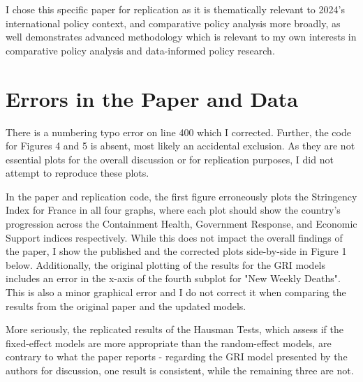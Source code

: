 \documentclass[12pt,letterpaper]{article}
\begin{document}
	\vspace{.25cm}
	
	\noindent I chose this specific paper for replication as it is thematically relevant to 2024's international policy context, and comparative policy analysis more broadly, as well demonstrates advanced methodology which is relevant to my own interests in comparative policy analysis and data-informed policy research.
	
	\vspace{.25cm}

	\section*{Errors in the Paper and Data}
	
	\vspace{.25cm}
	
	\noindent There is a numbering typo error on line 400 which I corrected. Further, the code for Figures 4 and 5 is absent, most likely an accidental exclusion. As they are not essential plots for the overall discussion or for replication purposes, I did not attempt to reproduce these plots.
	
	\vspace{.25cm}
	
	\noindent In the paper and replication code, the first figure erroneously plots the Stringency Index for France in all four graphs, where each plot should show the country's progression across the Containment Health, Government Response, and Economic Support indices respectively. While this does not impact the overall findings of the paper, I show the published and the corrected plots side-by-side in Figure 1 below. Additionally, the original plotting of the results for the GRI models includes an error in the x-axis of the fourth subplot for "New Weekly Deaths". This is also a minor graphical error and I do not correct it when comparing the results from the original paper and the updated models.
	
	\vspace{.25cm}
	
	\noindent More seriously, the replicated results of the Hausman Tests, which assess if the fixed-effect models are more appropriate than the random-effect models, are contrary to what the paper reports - regarding the GRI model presented by the authors for discussion, one result is consistent, while the remaining three are not.
	
	\vspace{.25cm}
	
\end{document}
